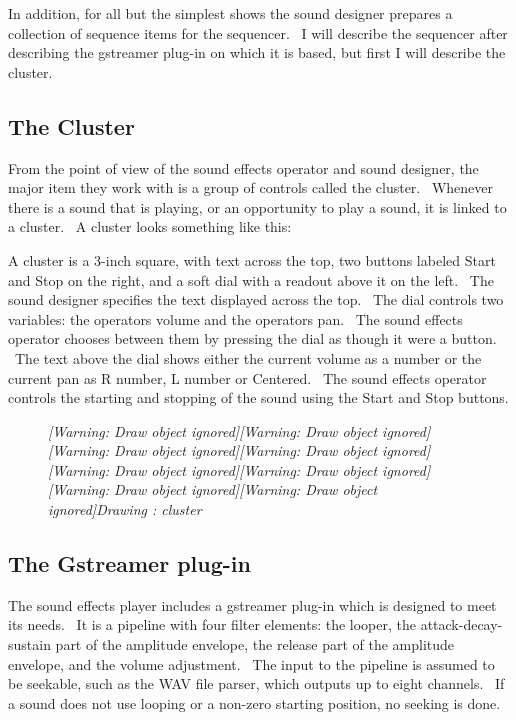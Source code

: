 \documentclass[letterpaper]{article}
\newcounter{Drawing}
\renewcommand\theDrawing{\arabic{Drawing}}
\begin{document}
In addition, for all but the simplest shows the sound designer prepares
a collection of sequence items for the sequencer. \ I will describe the
sequencer after describing the gstreamer plug-in on which it is based,
but first I will describe the cluster.

\subsection{The Cluster}
From the point of view of the sound effects operator and sound designer,
the major item they work with is a group of controls called the
cluster. \ Whenever there is a sound that is playing, or an opportunity
to play a sound, it is linked to a cluster. \ A cluster looks something
like this:

A cluster is a 3-inch square, with text across the top, two buttons
labeled Start and Stop on the right, and a soft dial with a readout
above it on the left. \ The sound designer specifies the text displayed
across the top. \ The dial controls two variables: the
operator{\textquotesingle}s volume and the operator{\textquotesingle}s
pan. \ The sound effects operator chooses between them by pressing the
dial as though it were a button. \ The text above the dial shows either
the current volume as a number or the current pan as R number, L number
or Centered. \ The sound effects operator controls the starting and
stopping of the sound using the Start and Stop buttons.

\begin{figure}
\centering
\begin{minipage}{7in}
{\centering\itshape
[Warning: Draw object ignored][Warning: Draw object ignored][Warning:
Draw object ignored][Warning: Draw object ignored][Warning: Draw object
ignored][Warning: Draw object ignored][Warning: Draw object
ignored][Warning: Draw object ignored]Drawing
\stepcounter{Drawing}{\theDrawing}: cluster
\par}
\end{minipage}
\end{figure}
\subsection{The Gstreamer plug-in}
The sound effects player includes a gstreamer plug-in which is designed
to meet its needs. \ It is a pipeline with four filter elements: the
looper, the attack-decay-sustain part of the amplitude envelope, the
release part of the amplitude envelope, and the volume adjustment.
\ The input to the pipeline is assumed to be seekable, such as the WAV
file parser, which outputs up to eight channels. \ If a sound does not
use looping or a non-zero starting position, no seeking is done.
\end{document}
